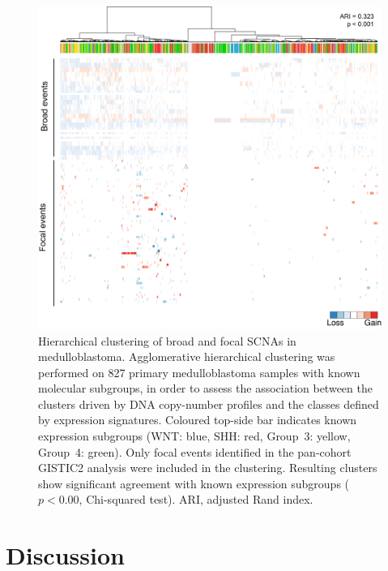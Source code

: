 \begin{figure}[b]
	\begin{center}
		\includegraphics[width=\textwidth]{fig/magic-cn/cn-clusters.png}
	\end{center}
	\caption[Hierarchical clustering of broad and focal SCNAs in medulloblastoma]
	{
		Hierarchical clustering of broad and focal SCNAs in medulloblastoma.
		Agglomerative hierarchical clustering was performed on 827 primary medulloblastoma samples with known molecular subgroups, in order to assess the association between the clusters driven by DNA copy-number profiles and the classes defined by expression signatures. Coloured top-side bar indicates known expression subgroups (WNT: blue, SHH: red, Group~3: yellow, Group~4: green). Only focal events identified in the pan-cohort GISTIC2 analysis were included in the clustering. Resulting clusters show significant agreement with known expression subgroups ($p < 0.00$, Chi-squared test). ARI, adjusted Rand index. 
	}
	\label{fig:cn-clusters}
\end{figure}

\clearpage

\section{Discussion}

